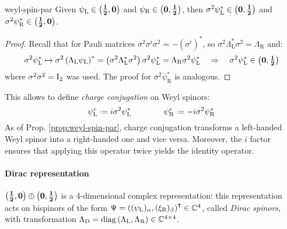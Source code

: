 \begin{proposition}{}{weyl-spin-par}
  Given $ \psi_\text{L} \in \mathbf{\left( \frac{1}{2},0 \right)} $ and $ \psi_\text{R} \in \mathbf{\left( 0,\frac{1}{2} \right)} $, then $ \sigma^2 \psi_\text{L}^* \in \mathbf{\left( 0,\frac{1}{2} \right)} $ and $ \sigma^2 \psi_\text{R}^* \in \mathbf{\left( \frac{1}{2},0 \right)} $.

  \tcblower

  \begin{proof}
    Recall that for Pauli matrices $ \sigma^2 \sigma^i \sigma^2 = -(\sigma^i)^* $, so $ \sigma^2 \Lambda_\text{L}^* \sigma^2 = \Lambda_\text{R} $ and:
    \begin{equation*}
      \sigma^2 \psi_\text{L}^* \mapsto \sigma^2 \left( \Lambda_\text{L} \psi_\text{L} \right)^* = \left( \sigma^2 \Lambda_\text{L}^* \sigma^2 \right) \sigma^2 \psi_\text{L}^* = \Lambda_\text{R} \sigma^2 \psi_\text{L}^*
      \quad \Rightarrow \quad
      \sigma^2 \psi_\text{L}^* \in \mathbf{\left( 0,\tfrac{1}{2} \right)}
    \end{equation*}
    where $ \sigma^2 \sigma^2 = \mathrm{I}_2 $ was used. The proof for $ \sigma^2 \psi_\text{R}^* $ is analogous.
  \end{proof}
\end{proposition}

This allows to define \textit{charge conjugation} on Weyl spinors:
\begin{equation}
  \psi_\text{L}^c \defeq i \sigma^2 \psi_\text{L}^*
  \qquad \qquad
  \psi_\text{R}^c \defeq -i \sigma^2 \psi_\text{R}^*
\end{equation}
As of Prop. \ref{prop:weyl-spin-par}, charge conjugation transforms a left-handed Weyl spinor into a right-handed one and vice versa. Moreover, the $ i $ factor ensures that applying this operator twice yields the identity operator.

\paragraph{Dirac representation}

$ \mathbf{\left( \frac{1}{2},0 \right)} \oplus \mathbf{\left( 0,\frac{1}{2} \right)} $ is a 4-dimensional complex representation: this representation acts on bispinors of the form $ \Psi = \left( (\psi_\text{L})_\alpha, (\xi_\text{R})_\beta \right)^\intercal \in \mathbb{C}^4 $, called \textit{Dirac spinors}, with transformation $ \Lambda_\text{D} = \operatorname{diag} \left( \Lambda_\text{L}, \Lambda_\text{R} \right) \in \mathbb{C}^{4 \times 4} $.

